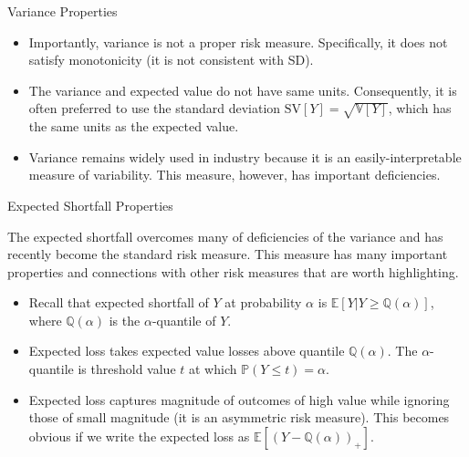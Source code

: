 \documentclass[9pt]{beamer}
\begin{document}
%
\begin{frame}{Variance Properties}

\begin{itemize}

\item Importantly, variance is not a proper risk measure. Specifically, it does not satisfy monotonicity (it is not consistent with SD). 

\item The variance and expected value do not have same units. Consequently, it is often preferred to use the standard deviation $\textrm{SV}[Y]=\sqrt{\mathbb{V}[Y]}$, which has the same units as the expected value. 

\item Variance remains widely used in industry because it is an easily-interpretable measure of variability. This measure, however, has important deficiencies. 

\end{itemize}


\end{frame}

%
\begin{frame}{Expected Shortfall Properties}


The expected shortfall overcomes many of deficiencies of the variance and has recently become the standard risk measure.  This measure has many important properties and connections with other risk measures that are worth highlighting.  

\begin{itemize}
\item Recall that expected shortfall of $Y$ at probability $\alpha$ is $\mathbb{E}[Y|Y\geq \mathbb{Q}(\alpha)]$, where $\mathbb{Q}(\alpha)$ is the $\alpha$-quantile of $Y$. 

\item Expected loss takes expected value losses above quantile $\mathbb{Q}(\alpha)$. The  $\alpha$-quantile is threshold value $t$ at which $\mathbb{P}(Y\leq t)=\alpha$. 

\item Expected loss captures magnitude of outcomes of high value while ignoring those of small magnitude (it is an asymmetric risk measure). This becomes obvious if we write the expected loss as $\mathbb{E}[(Y-\mathbb{Q}(\alpha))_+]$. 

\end{itemize}



\end{frame}
\end{document}

